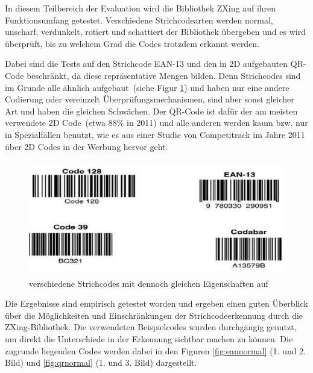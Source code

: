 \writtenby{\dcauthornameriren}%
In diesem Teilbereich der Evaluation wird die Bibliothek ZXing auf ihren Funktionsumfang getestet.
Verschiedene Strichcodearten werden normal, unscharf, verdunkelt, rotiert und schattiert der Bibliothek übergeben und es wird überprüft, bis zu welchem Grad die Codes trotzdem erkannt werden.

Dabei sind die Tests auf den Strichcode EAN-13 und den in 2D aufgebauten QR-Code beschränkt, da diese repräsentative Mengen bilden. Denn Strichcodes sind im Grunde alle ähnlich aufgebaut~(siehe Figur \ref{fig:similarcodes}) und haben nur eine andere Codierung oder vereinzelt Überprüfungsmechanismen, sind aber sonst gleicher Art und haben die gleichen Schwächen. Der QR-Code ist dafür der am meisten verwendete 2D Code~(etwa 88\% in 2011) und alle anderen werden kaum bzw. nur in Spezialfällen benutzt, wie es aus einer Studie von Competitrack im Jahre 2011 über 2D Codes in der Werbung hervor geht.
~\cite{Cometitrack2011}

\begin{figure}[H]
  \centering
  \includegraphics[height=5cm]{img/EAN13/strichcodes.jpg}
  \caption[verschiedene Strichcodes]{verschiedene Strichcodes mit dennoch gleichen Eigenschaften auf}
  \label{fig:similarcodes}
\end{figure}

Die Ergebnisse sind empirisch getestet worden und ergeben einen guten Überblick über die Möglichkeiten und Einschränkungen der Strichcodeerkennung durch die \mbox{ZXing}-Bibliothek. Die verwendeten Beispielcodes wurden durchgängig genutzt, um direkt die Unterschiede in der Erkennung sichtbar machen zu können. Die zugrunde liegenden Codes werden dabei in den Figuren \ref*{fig:eannormal} (1. und 2. Bild) und \ref*{fig:qrnormal} (1. und 3. Bild) dargestellt.
